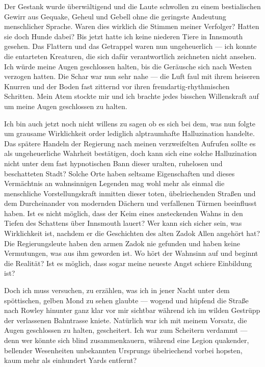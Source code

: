 Der Gestank wurde überwältigend und die Laute schwollen zu einem bestialischen Gewirr aus Gequake, Geheul und Gebell ohne die geringste Andeutung menschlicher Sprache. Waren dies wirklich die Stimmen meiner Verfolger? Hatten sie doch Hunde dabei? Bis jetzt hatte ich keine niederen Tiere in Innsmouth gesehen. Das Flattern und das Getrappel waren nun ungeheuerlich --- ich konnte die entarteten Kreaturen, die sich dafür verantwortlich zeichneten nicht ansehen. Ich würde meine Augen geschlossen halten, bis die Geräusche sich nach Westen verzogen hatten. Die Schar war nun sehr nahe --- die Luft faul mit ihrem heiseren Knurren und der Boden fast zitternd vor ihren fremdartig-rhythmischen Schritten. Mein Atem stockte mir und ich brachte jedes bisschen Willenskraft auf um meine Augen geschlossen zu halten.

Ich bin auch jetzt noch nicht willens zu sagen ob es sich bei dem, was nun folgte um grausame Wirklichkeit order lediglich alptraumhafte Halluzination handelte. Das spätere Handeln der Regierung nach meinen verzweifelten Aufrufen sollte es als ungeheuerliche Wahrheit bestätigen, doch kann sich eine solche Halluzination nicht unter dem fast hypnotischen Bann dieser uralten, ruhelosen und beschatteten Stadt? Solche Orte haben seltsame Eigenschaften und dieses Vermächtnis an wahnsinnigen Legenden mag wohl mehr als einmal die menschliche Vorstellungskraft inmitten dieser toten, übelriechenden Straßen und dem Durcheinander von modernden Dächern und verfallenen Türmen beeinflusst haben.  Ist es nicht möglich, dass der Keim eines ansteckenden Wahns in den Tiefen des Schattens über Innsmouth lauert? Wer kann sich sicher sein, was Wirklichkeit ist, nachdem er die Geschichten des alten Zadok Allen angehört hat? Die Regierungsleute haben den armen Zadok nie gefunden und haben keine Vermutungen, was aus ihm geworden ist. Wo hört der Wahnsinn auf und beginnt die Realität? Ist es möglich, dass sogar meine neueste Angst schiere Einbildung ist?

Doch ich muss versuchen, zu erzählen, was ich in jener Nacht unter dem spöttischen, gelben Mond zu sehen glaubte --- wogend und hüpfend die Straße nach Rowley hinunter ganz klar vor mir sichtbar während ich im wilden Gestrüpp der verlassenen Bahntrasse kniete. Natürlich war ich mit  meinem Vorsatz, die Augen geschlossen zu halten, gescheitert. Ich war zum Scheitern verdammt --- denn wer könnte sich blind zusammenkauern, während eine Legion quakender, bellender Wesenheiten unbekannten Ursprungs übelriechend vorbei hopsten, kaum mehr als einhundert Yards entfernt?

